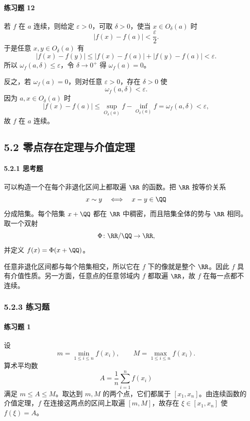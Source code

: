 \paragraph{练习题 12}
\begin{xsolution}
若 $f$ 在 $a$ 连续，则给定 $\varepsilon>0$，可取 $\delta>0$，使当 $x\in O_\delta(a)$ 时
\[
 |f(x)-f(a)|<\frac\varepsilon2.
\]
于是任意 $x,y\in O_\delta(a)$ 有
\[
 |f(x)-f(y)|\le|f(x)-f(a)|+|f(y)-f(a)|<\varepsilon.
\]
所以 $\omega_f(a,\delta)\le\varepsilon$，令 $\delta\to0^+$ 得 $\omega_f(a)=0$。

反之，若 $\omega_f(a)=0$，则对任意 $\varepsilon>0$，存在 $\delta>0$ 使
\[
 \omega_f(a,\delta)<\varepsilon.
\]
因为 $a,x\in O_\delta(a)$ 时
\[
 |f(x)-f(a)|\le
 \sup_{O_\delta(a)}f-\inf_{O_\delta(a)}f
 =\omega_f(a,\delta)<\varepsilon,
\]
故 $f$ 在 $a$ 连续。
\end{xsolution}

\subsection*{5.2 零点存在定理与介值定理}

\paragraph{5.2.1 思考题}
\begin{xsolution}
可以构造一个在每个非退化区间上都取遍 $\RR$ 的函数。把 $\RR$ 按等价关系
\[
 x\sim y\quad\Longleftrightarrow\quad x-y\in\QQ
\]
分成陪集。每个陪集 $x+\QQ$ 都在 $\RR$ 中稠密，而且陪集全体的势与 $\RR$ 相同。取一个双射
\[
 \Phi\colon \RR/\QQ\to\RR,
\]
并定义 $f(x)=\Phi(x+\QQ)$。

任意非退化区间都与每个陪集相交，所以它在 $f$ 下的像就是整个 $\RR$。因此 $f$ 具有介值性质。另一方面，任意点的任意邻域内 $f$ 都取遍 $\RR$，故 $f$ 在每一点都不连续。
\end{xsolution}

\subsubsection*{5.2.3 练习题}

\paragraph{练习题 1}
\begin{xsolution}
设
\[
 m=\min_{1\le i\le n}f(x_i),\qquad
 M=\max_{1\le i\le n}f(x_i).
\]
算术平均数
\[
 A=\frac1n\sum_{i=1}^n f(x_i)
\]
满足 $m\le A\le M$。取达到 $m,M$ 的两个点，它们都属于 $[x_1,x_n]$。由连续函数的介值定理，$f$ 在连接这两点的区间上取遍 $[m,M]$，故存在 $\xi\in[x_1,x_n]$ 使 $f(\xi)=A$。
\end{xsolution}

